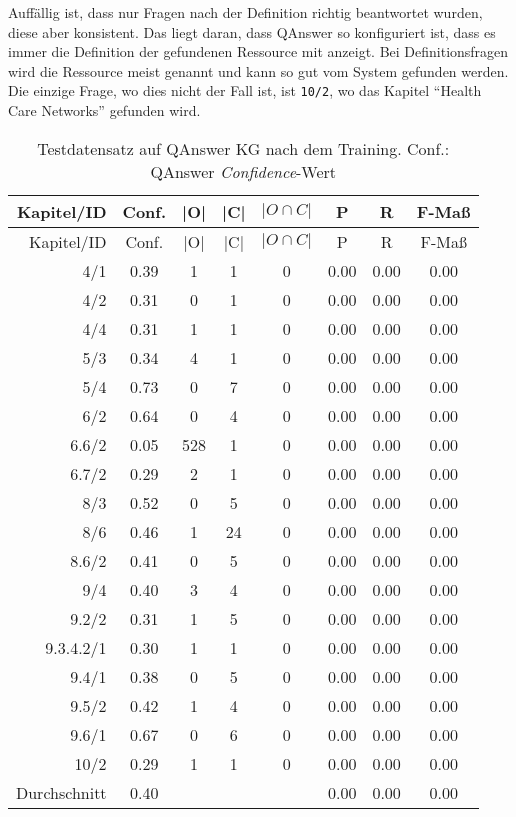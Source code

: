 Auffällig ist, dass nur Fragen nach der Definition richtig beantwortet wurden, diese aber konsistent.
Das liegt daran, dass QAnswer so konfiguriert ist, dass es immer die Definition der gefundenen Ressource mit anzeigt.
Bei Definitionsfragen wird die Ressource meist genannt und kann so gut vom System gefunden werden.
Die einzige Frage, wo dies nicht der Fall ist, ist \texttt{10/2}, wo das Kapitel \enquote{Health Care Networks} gefunden wird.

\begin{longtable}{r c c c c c c c}
  \caption[Testdatensatz QAnswer nach Training]{Testdatensatz auf QAnswer KG nach dem Training.
  Conf.: QAnswer \emph{Confidence}-Wert}
  \label{tab:qanswervortraining}
  \\
  \toprule
  Kapitel/ID    & Conf. & |O|   & |C|   & $|O \cap C|$  & P     & R     & F-Maß   \\
  \midrule
  \endfirsthead
  \toprule
  Kapitel/ID    & Conf. & |O|   & |C|   & $|O \cap C|$  & P     & R     & F-Maß   \\
  \midrule
  \endhead
	4/1			& 0.39 & 1 & 1 & 0 & 0.00 & 0.00 & 0.00 \\
	4/2			& 0.31 & 0 & 1 & 0 & 0.00 & 0.00 & 0.00 \\
	4/4			& 0.31 & 1 & 1 & 0 & 0.00 & 0.00 & 0.00 \\
	5/3			& 0.34 & 4 & 1 & 0 & 0.00 & 0.00 & 0.00 \\
	5/4			& 0.73 & 0 & 7 & 0 & 0.00 & 0.00 & 0.00 \\
	6/2			& 0.64 & 0 & 4 & 0 & 0.00 & 0.00 & 0.00 \\
	6.6/2		& 0.05 & 528 & 1 & 0 & 0.00 & 0.00 & 0.00 \\
	6.7/2		& 0.29 & 2 & 1 & 0 & 0.00 & 0.00 & 0.00 \\
	8/3			& 0.52 & 0 & 5 & 0 & 0.00 & 0.00 & 0.00 \\
	8/6			& 0.46 & 1 & 24 & 0 & 0.00 & 0.00 & 0.00 \\
	8.6/2		& 0.41 & 0 & 5 & 0 & 0.00 & 0.00 & 0.00 \\
	9/4			& 0.40 & 3 & 4 & 0 & 0.00 & 0.00 & 0.00 \\
	9.2/2		& 0.31 & 1 & 5 & 0 & 0.00 & 0.00 & 0.00 \\
	9.3.4.2/1	& 0.30 & 1 & 1 & 0 & 0.00 & 0.00 & 0.00 \\
	9.4/1		& 0.38 & 0 & 5 & 0 & 0.00 & 0.00 & 0.00 \\
	9.5/2		& 0.42 & 1 & 4 & 0 & 0.00 & 0.00 & 0.00 \\
	9.6/1		& 0.67 & 0 & 6 & 0 & 0.00 & 0.00 & 0.00 \\
	10/2		& 0.29 & 1 & 1 & 0 & 0.00 & 0.00 & 0.00 \\
  \midrule
  Durchschnitt  & 0.40 &  &  &   & 0.00 & 0.00 & 0.00 \\
  \bottomrule
\end{longtable}

